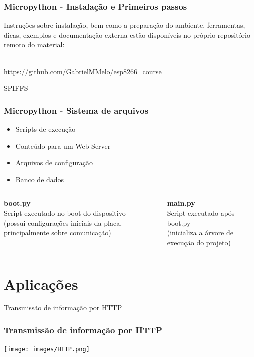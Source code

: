 \documentclass[10pt, compress]{beamer}
\begin{document}
\begin{frame}
  \frametitle{Micropython - Instalação e Primeiros passos}
  Instruções sobre instalação, bem como a preparação do ambiente, ferramentas, dicas, exemplos e documentação externa estão disponíveis no próprio repositório remoto do material: \\\\
  \begin{center}
    https://github.com/GabrielMMelo/esp8266\_course
  \end{center}
\end{frame}

\begin{frame}{SPIFFS}
  \frametitle{Micropython - Sistema de arquivos}

  \begin{itemize}
    \item Scripts de execução
    \item Conteúdo para um Web Server
    \item Arquivos de configuração
    \item Banco de dados


  \end{itemize}
 
  \begin{columns}
    \begin{column}{0.48\textwidth}

    \textbf{boot.py} \\
    Script executado no boot do dispositivo \\
    (possui configurações iniciais da placa, principalmente sobre comunicação)

    \end{column}
    \begin{column}{0.48\textwidth}

    \textbf{main.py} \\
    Script executado após boot.py \\
    (inicializa a árvore de execução do projeto)

    \end{column}
  \end{columns}
\end{frame}


\section{Aplicações}

\begin{frame}{Transmissão de informação por HTTP}
  \frametitle{Transmissão de informação por HTTP}
  \begin{center}
    \texttt{[image: images/HTTP.png]}\\
  \end{center}
\end{frame}
\end{document}
